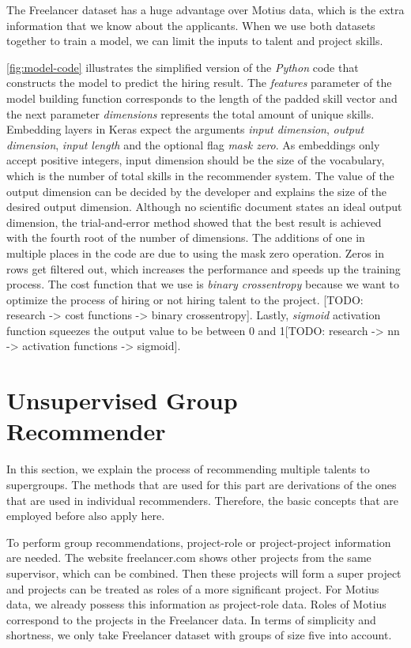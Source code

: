 The Freelancer dataset has a huge advantage over Motius data, which is the extra information that we know about the applicants. When we use both datasets together to train a model, we can limit the inputs to talent and project skills. 

\autoref{fig:model-code} illustrates the simplified version of the \textit{Python} code that constructs the model to predict the hiring result. The \textit{features} parameter of the model building function corresponds to the length of the padded skill vector and the next parameter \textit{dimensions} represents the total amount of unique skills. Embedding layers in Keras expect the arguments \textit{input dimension}, \textit{output dimension}, \textit{input length} and the optional flag \textit{mask zero}. As embeddings only accept positive integers, input dimension should be the size of the vocabulary, which is the number of total skills in the recommender system. The value of the output dimension can be decided by the developer and explains the size of the desired output dimension. Although no scientific document states an ideal output dimension, the trial-and-error method showed that the best result is achieved with the fourth root of the number of dimensions. The additions of one in multiple places in the code are due to using the mask zero operation. Zeros in rows get filtered out, which increases the performance and speeds up the training process. The cost function that we use is \textit{binary crossentropy} because we want to optimize the process of hiring or not hiring talent to the project. [TODO: research -> cost functions -> binary crossentropy]. Lastly, \textit{sigmoid} activation function squeezes the output value to be between 0 and 1[TODO: research -> nn -> activation functions -> sigmoid].


\section{Unsupervised Group Recommender}\label{section:unsupervised-group-rec}

In this section, we explain the process of recommending multiple talents to supergroups. The methods that are used for this part are derivations of the ones that are used in individual recommenders. Therefore, the basic concepts that are employed before also apply here. 

To perform group recommendations, project-role or project-project information are needed. The website freelancer.com shows other projects from the same supervisor, which can be combined. Then these projects will form a super project and projects can be treated as roles of a more significant project. For Motius data, we already possess this information as project-role data. Roles of Motius correspond to the projects in the Freelancer data. In terms of simplicity and shortness, we only take Freelancer dataset with groups of size five into account. 

